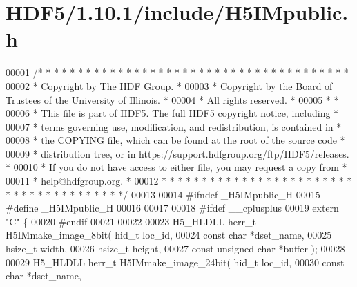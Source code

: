 \hypertarget{_h_d_f5_21_810_81_2include_2_h5_i_mpublic_8h_source}{}\section{H\+D\+F5/1.10.1/include/\+H5\+I\+Mpublic.h}
\label{_h_d_f5_21_810_81_2include_2_h5_i_mpublic_8h_source}

\begin{DoxyCode}
00001 \textcolor{comment}{/* * * * * * * * * * * * * * * * * * * * * * * * * * * * * * * * * * * * * * *}
00002 \textcolor{comment}{ * Copyright by The HDF Group.                                               *}
00003 \textcolor{comment}{ * Copyright by the Board of Trustees of the University of Illinois.         *}
00004 \textcolor{comment}{ * All rights reserved.                                                      *}
00005 \textcolor{comment}{ *                                                                           *}
00006 \textcolor{comment}{ * This file is part of HDF5.  The full HDF5 copyright notice, including     *}
00007 \textcolor{comment}{ * terms governing use, modification, and redistribution, is contained in    *}
00008 \textcolor{comment}{ * the COPYING file, which can be found at the root of the source code       *}
00009 \textcolor{comment}{ * distribution tree, or in https://support.hdfgroup.org/ftp/HDF5/releases.  *}
00010 \textcolor{comment}{ * If you do not have access to either file, you may request a copy from     *}
00011 \textcolor{comment}{ * help@hdfgroup.org.                                                        *}
00012 \textcolor{comment}{ * * * * * * * * * * * * * * * * * * * * * * * * * * * * * * * * * * * * * * */}
00013 
00014 \textcolor{preprocessor}{#ifndef \_H5IMpublic\_H}
00015 \textcolor{preprocessor}{#define \_H5IMpublic\_H}
00016 
00017 
00018 \textcolor{preprocessor}{#ifdef \_\_cplusplus}
00019 \textcolor{keyword}{extern} \textcolor{stringliteral}{"C"} \{
00020 \textcolor{preprocessor}{#endif}
00021 
00022 
00023 H5\_HLDLL herr\_t  H5IMmake\_image\_8bit( hid\_t loc\_id,
00024                             \textcolor{keyword}{const} \textcolor{keywordtype}{char} *dset\_name,
00025                             hsize\_t width,
00026                             hsize\_t height,
00027                             \textcolor{keyword}{const} \textcolor{keywordtype}{unsigned} \textcolor{keywordtype}{char} *buffer );
00028 
00029 H5\_HLDLL herr\_t  H5IMmake\_image\_24bit( hid\_t loc\_id,
00030                              \textcolor{keyword}{const} \textcolor{keywordtype}{char} *dset\_name,

\end{DoxyCode}
